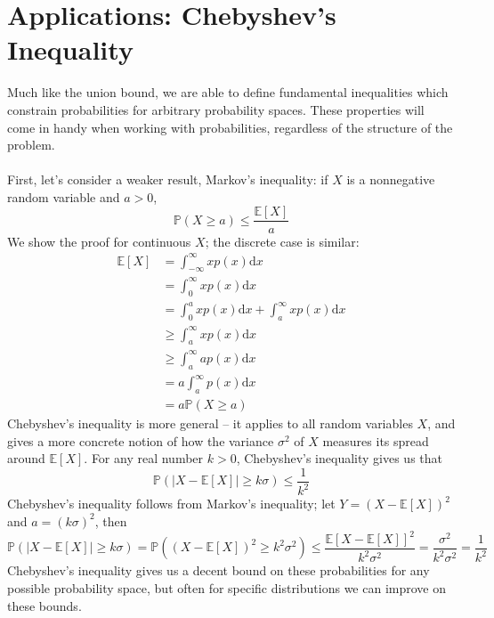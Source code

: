 \documentclass{article}
\newcommand{\PrMe}{\mathbb{P}}
\begin{document}
\clearpage
\section*{Applications: Chebyshev's Inequality}
Much like the union bound, we are able to define fundamental inequalities which constrain probabilities for arbitrary probability spaces. These properties will come in handy when working with probabilities, regardless of the structure of the problem. \\\\
First, let's consider a weaker result, Markov's inequality: if $X$ is a nonnegative random variable and $a > 0$,  $$\PrMe(X \geq a) \leq \frac{\mathbb{E}[X]}{a}$$ We show the proof for continuous $X$; the discrete case is similar:
\begin{align*}
\mathbb{E}[X] &= \int_{-\infty}^\infty xp(x)\text{d}x \\
&= \int_0^\infty xp(x)\text{d}x \\
&= \int_0^a xp(x)\text{d}x + \int_a^\infty xp(x)\text{d}x \\
&\geq \int_a^\infty xp(x)\text{d}x \\
&\geq \int_a^\infty ap(x)\text{d}x \\
&= a\int_a^\infty p(x)\text{d}x \\
&= a\PrMe(X \geq a)
\end{align*}
Chebyshev's inequality is more general -- it applies to all random variables $X$, and gives a more concrete notion of how the variance $\sigma^2$ of $X$ measures its spread around $\mathbb{E}[X]$. For any real number $k > 0$, Chebyshev's inequality gives us that $$\PrMe(|X - \mathbb{E}[X]| \geq k\sigma) \leq \frac{1}{k^2}$$
Chebyshev's inequality follows from Markov's inequality; let $Y = (X - \mathbb{E}[X])^2$ and $a = (k\sigma)^2$, then $$\PrMe(|X - \mathbb{E}[X]| \geq k\sigma) = \PrMe((X - \mathbb{E}[X])^2 \geq k^2\sigma^2) \leq \frac{\mathbb{E}[X - \mathbb{E}[X]]^2}{k^2\sigma^2} = \frac{\sigma^2}{k^2\sigma^2} = \frac{1}{k^2}$$
Chebyshev's inequality gives us a decent bound on these probabilities for any possible probability space, but often for specific distributions we can improve on these bounds.
\clearpage
\end{document}
